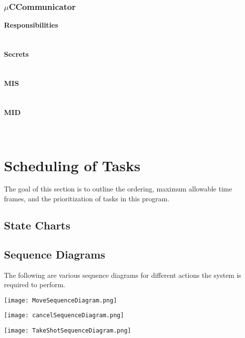 \documentclass[titlepage]{article}
\begin{document}
\subsubsection{$\mu$CCommunicator}
\textbf{Responsibilities}\\
\\\\%
\textbf{Secrets}\\
\\\\%
\textbf{MIS}\\
\\\\%
\textbf{MID}\\
\\\\%


\section{Scheduling of Tasks}
The goal of this section is to outline the ordering, maximum allowable time frames, and the prioritization of tasks in this program.
\subsection{State Charts}
\subsection{Sequence Diagrams}
The following are various sequence diagrams for different actions the system is required to perform.
\begin{center}
	\texttt{[image: MoveSequenceDiagram.png]}
\label{fig:MoveSequenceDiagram}
\end{center}
\begin{center}
	\texttt{[image: cancelSequenceDiagram.png]}
\label{fig:CancelSequenceDiagram}
\end{center}
\begin{center}
	\texttt{[image: TakeShotSequenceDiagram.png]}
\label{fig:TakeShotSequenceDiagram}
\end{center}
\end{document}
